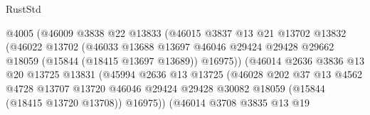 \begin{lexlean}{RustStd}
\begin{coremodule}
                                  @4005
                                  (@46009
                                    @3838
                                    @22
                                    @13833
                                    (@46015
                                      @3837
                                      @13
                                      @21
                                      @13702
                                      @13832
                                      (@46022
                                        @13702
                                        (@46033
                                          @13688
                                          @13697
                                          @46046
                                          @29424
                                          @29428
                                          @29662
                                          @18059
                                          (@15844 (@18415 @13697 @13689))
                                          @16975))
                                      (@46014
                                        @2636
                                        @3836
                                        @13
                                        @20
                                        @13725
                                        @13831
                                        (@45994
                                          @2636
                                          @13
                                          @13725
                                          (@46028
                                            @202
                                            @37
                                            @13
                                            @4562
                                            @4728
                                            @13707
                                            @13720
                                            @46046
                                            @29424
                                            @29428
                                            @30082
                                            @18059
                                            (@15844 (@18415 @13720 @13708))
                                            @16975))
                                        (@46014
                                          @3708
                                          @3835
                                          @13
                                          @19

\end{coremodule}
\end{lexlean}
